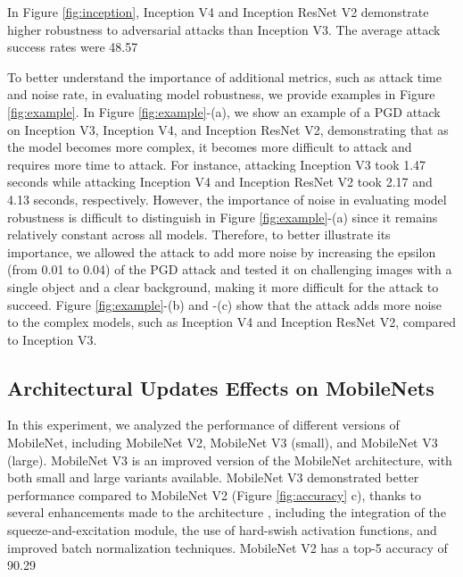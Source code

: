 In Figure \ref{fig:inception}, Inception V4 and Inception ResNet V2 demonstrate higher robustness to adversarial attacks than Inception V3. The average attack success rates were 48.57\


To better understand the importance of additional metrics, such as attack time and noise rate, in evaluating model robustness, we provide examples in Figure \ref{fig:example}. In Figure \ref{fig:example}-(a), we show an example of a PGD attack on Inception V3, Inception V4, and Inception ResNet V2, demonstrating that as the model becomes more complex, it becomes more difficult to attack and requires more time to attack.
For instance, attacking Inception V3 took 1.47 seconds while attacking Inception V4 and Inception ResNet V2 took 2.17 and 4.13 seconds, respectively. 
However, the importance of noise in evaluating model robustness is difficult to distinguish in Figure \ref{fig:example}-(a) since it remains relatively constant across all models. Therefore, to better illustrate its importance, we allowed the attack to add more noise by increasing the epsilon (from 0.01 to 0.04) of the PGD attack and tested it on challenging images with a single object and a clear background, making it more difficult for the attack to succeed. 
Figure \ref{fig:example}-(b) and -(c) show that the attack adds more noise to the complex models, such as Inception V4 and Inception ResNet V2, compared to Inception V3.

\subsection{Architectural Updates Effects on MobileNets}  
In this experiment, we analyzed the performance of different versions of MobileNet, including MobileNet V2, MobileNet V3 (small), and MobileNet V3 (large). MobileNet V3 is an improved version of the MobileNet architecture, with both small and large variants available. MobileNet V3 demonstrated better performance compared to MobileNet V2 (Figure \ref{fig:accuracy} c), thanks to 
several enhancements made to the architecture \cite{howard2019searching}, including the integration of the squeeze-and-excitation module, the use of hard-swish activation functions, and improved batch normalization techniques. MobileNet V2 has a top-5 accuracy of 90.29\

